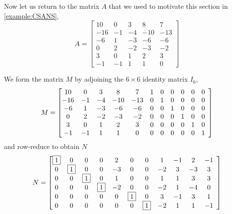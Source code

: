 \documentclass{ximera}
\begin{document}
\begin{example}

  Now let us return to the matrix $A$ that we used to motivate this section in \ref{example:CSANS},
  \[
    A=
    \begin{bmatrix}
      10 & 0 & 3 & 8 & 7 \\
      -16 & -1 & -4 & -10 & -13 \\
      -6 & 1 & -3 & -6 & -6 \\
      0 & 2 & -2 & -3 & -2 \\
      3 & 0 & 1 & 2 & 3 \\
      -1 & -1 & 1 & 1 & 0
    \end{bmatrix}
  \]

  We form the matrix $M$ by adjoining the $6\times 6$ identity matrix $I_6$,
  \[
    M=
    \left[\begin{array}{@{}*{12}{c}@{}}
      10 & 0 & 3 & 8 & 7 & 1 & 0 & 0 & 0 & 0 & 0 \\
      -16 & -1 & -4 & -10 & -13 & 0 & 1 & 0 & 0 & 0 & 0 \\
      -6 & 1 & -3 & -6 & -6 & 0 & 0 & 1 & 0 & 0 & 0 \\
      0 & 2 & -2 & -3 & -2 & 0 & 0 & 0 & 1 & 0 & 0 \\
      3 & 0 & 1 & 2 & 3 & 0 & 0 & 0 & 0 & 1 & 0 \\
      -1 & -1 & 1 & 1 & 0 & 0 & 0 & 0 & 0 & 0 & 1
    \end{array}\right]
  \]
  and row-reduce to obtain $N$
  \[
    N=
    \left[\begin{array}{@{}*{12}{c}@{}}
      \leading{1} & 0 & 0 & 0 & 2 & 0 & 0 & 1 & -1 & 2 & -1 \\
      0 & \leading{1} & 0 & 0 & -3 & 0 & 0 & -2 & 3 & -3 & 3 \\
      0 & 0 & \leading{1} & 0 & 1 & 0 & 0 & 1 & 1 & 3 & 3 \\
      0 & 0 & 0 & \leading{1} & -2 & 0 & 0 & -2 & 1 & -4 & 0 \\
      0 & 0 & 0 & 0 & 0 & \leading{1} & 0 & 3 & -1 & 3 & 1 \\
      0 & 0 & 0 & 0 & 0 & 0 & \leading{1} & -2 & 1 & 1 & -1
          \end{array}\right]
  \]
  

\end{example}
\end{document}
